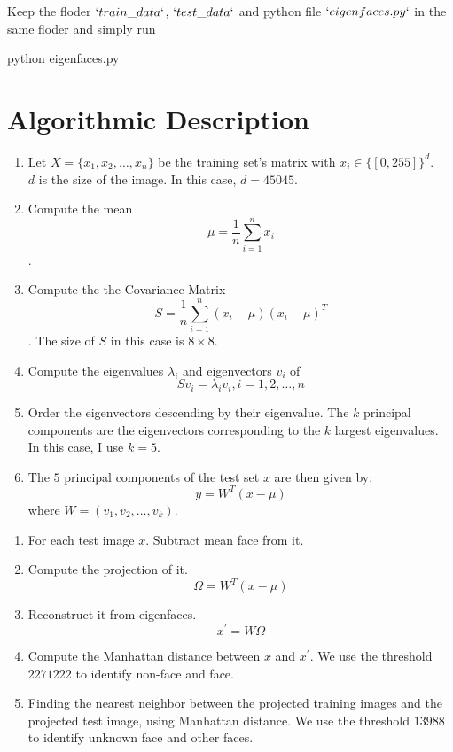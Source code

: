 \documentclass[letterpaper]{polythesis}
\begin{document}
Keep the floder $`train\_data`$, $`test\_data`$ and python file $`eigenfaces.py`$
in the same floder and simply run

\begin{python}
python eigenfaces.py
\end{python}

\chapter{Algorithmic Description}
\label{ch-2}

\begin{enumerate}[step 1]
\item Let $X = \{ x_{1}, x_{2}, \ldots, x_{n} \}$ be the
      training set's matrix with $x_i \in \{[0, 255]\}^{d}$.\\
      $d$ is the size of the image. In this case, $d = 45045$.
\item Compute the mean $$\mu = \frac{1}{n} \sum_{i=1}^{n} x_{i}$$.
\item Compute the the Covariance Matrix
      $$S = \frac{1}{n} \sum_{i=1}^{n} (x_{i} - \mu) (x_{i} - \mu)^T$$.
      The size of $S$ in this case is $8\times 8$.
\item Compute the eigenvalues $\lambda_{i}$ and eigenvectors $v_{i}$ of $$
S v_{i} = \lambda_{i} v_{i}, i=1,2,\ldots,n$$
\item Order the eigenvectors descending by their eigenvalue.
      The $k$ principal components are the eigenvectors corresponding to
      the $k$ largest eigenvalues. \\
      In this case, I use $k=5$.
\item The $5$ principal components of the test set $x$ are then given by:
      $$y = W^{T} (x - \mu)$$
      where $W = (v_{1}, v_{2}, \ldots, v_{k})$.\\
\end{enumerate}

\begin{enumerate}[step 1]
  \item For each test image $x$. Subtract mean face from it.
  \item Compute the projection of it.
        $$\Omega = W^T(x-\mu)$$
  \item Reconstruct it from eigenfaces.
        $$x^\prime = W\Omega$$
  \item Compute the Manhattan distance between $x$ and $x^\prime$.
        We use the threshold $2271222$ to identify non-face and face.
  \item Finding the nearest neighbor between the projected training images and
        the projected test image, using Manhattan distance. We use the threshold
        $13988$ to identify unknown face and other faces.
\end{enumerate}
\end{document}
